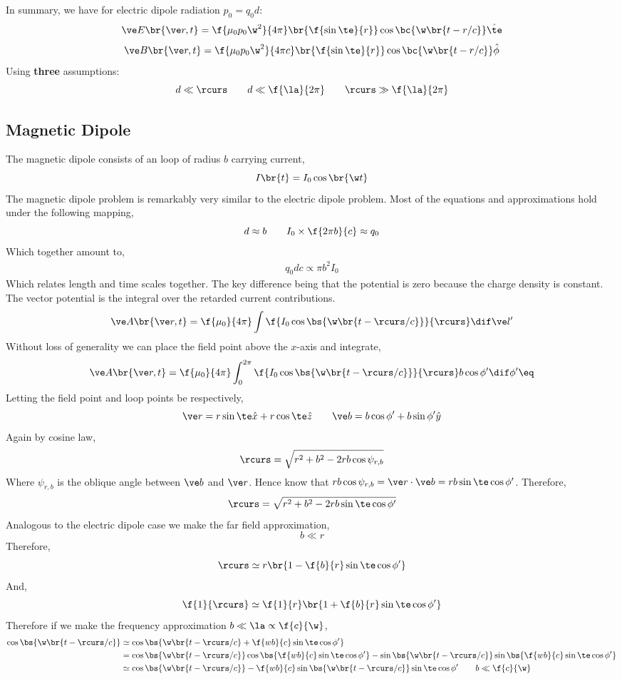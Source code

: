 \documentclass{article}
\begin{document}
In summary, we have for electric dipole radiation $p_0 = q_0 d$:
\[ \ve E\br{\ve r, t} =  \f{\mu_0 p_0 \w^2}{4 \pi} \br{\f{\sin \te}{r}}\cos \bc{\w \br{t - r/ c}}\hat \te\]
\[ \ve B\br{\ve r, t} =  \f{\mu_0 p_0 \w^2}{4 \pi c} \br{\f{\sin \te}{r}} \cos \bc{\w \br{t - r/ c}}\hat \phi \]
Using \textbf{three} assumptions:
\[ d \ll \rcurs \qquad d \ll \f{\la}{2\pi} \qquad \rcurs \gg \f{\la}{2 \pi} \]

\subsection{Magnetic Dipole}
The magnetic dipole consists of an loop of radius $b$ carrying current,
\[ I\br{t} = I_0 \cos \br{\w t} \]
The magnetic dipole problem is remarkably very similar to the electric dipole problem. Most of the equations and approximations hold under the following mapping,
\[ d \approx b \qquad I_0 \times \f{2 \pi b}{c} \approx q_0 \]
Which together amount to,
\begin{align*}
    q_0 d c \propto \pi b^2 I_0
\end{align*}
Which relates length and time scales together. The key difference being that the potential is zero because the charge density is constant.
The vector potential is the integral over the retarded current contributions.
\[ \ve A \br{\ve r, t} = \f{\mu_0}{4 \pi} \int \f{I_0 \cos\bs{\w\br{t - \rcurs / c}}}{\rcurs} \dif \ve l' \]
Without loss of generality we can place the field point above the $x$-axis and integrate,
\[ \ve A \br{\ve r, t} = \f{\mu_0}{4 \pi} \int_{0}^{2\pi} \f{I_0 \cos\bs{\w\br{t - \rcurs / c}}}{\rcurs} b \cos \phi' \dif \phi' \eq \label{eq:A_magnetic_dipole}\]
Letting the field point and loop points be respectively,
\[ \ve r = r \sin \te \hat x + r \cos \te \hat z \qquad \ve b = b \cos \phi' + b \sin \phi' \hat y \]
Again by cosine law,
\[ \rcurs = \sqrt{r^2 + b^2 - 2 r b \cos \psi_{r,b}} \]
Where $\psi_{r,b}$ is the oblique angle between $\ve b$ and $\ve r$. Hence know that $r b \cos \psi_{r, b} = \ve r \cdot \ve b = rb \sin \te \cos \phi'$. Therefore,
\[ \rcurs = \sqrt{r^2 + b^2 - 2 r b \sin \te \cos \phi'} \]
Analogous to the electric dipole case we make the far field approximation,
\[ b \ll r \]
Therefore,
\[ \rcurs \simeq r\br{1 - \f{b}{r}\sin \te \cos \phi'} \]
And,
\[ \f{1}{\rcurs} \simeq \f{1}{r}\br{1 + \f{b}{r}\sin \te \cos \phi'} \]
Therefore if we make the frequency approximation $b \ll \la \propto \f{c}{\w}$,
\begin{align*}
    \cos \bs{\w\br{t - \rcurs/ c}}
    &\simeq \cos\bs{\w \br{t - \rcurs /c} + \f{wb}{c} \sin \te \cos \phi'} \\
    &= \cos\bs{\w \br{t - \rcurs /c}}\cos\bs{\f{wb}{c} \sin \te \cos \phi'} - \sin\bs{\w \br{t - \rcurs /c}}\sin\bs{\f{wb}{c} \sin \te \cos \phi'} \\
    &\simeq \cos\bs{\w \br{t - \rcurs /c}} - \f{wb}{c}\sin\bs{\w \br{t - \rcurs /c}} \sin \te \cos \phi' \qquad b \ll \f{c}{\w}
\end{align*}
\end{document}
